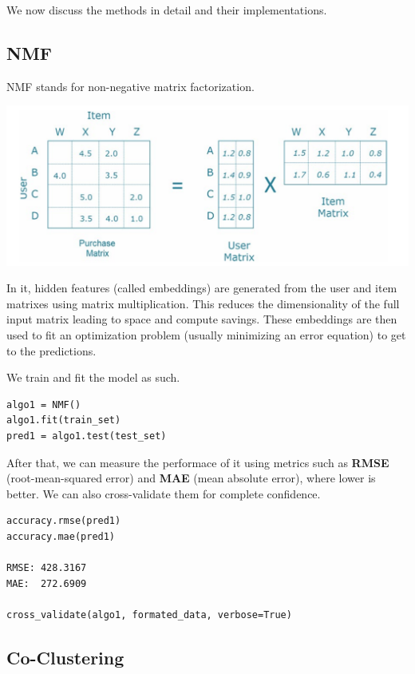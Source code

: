 \documentclass{article}
\begin{document}
We now discuss the methods in detail and their implementations.

\subsection{NMF}

NMF stands for non-negative matrix factorization.

\begin{center}
\includegraphics[scale=0.25]{04.png}
\end{center}

In it, hidden features (called embeddings) are generated from the user and item matrixes using matrix multiplication. This reduces the dimensionality of the full input matrix leading to space and compute savings. These embeddings are then used to fit an optimization problem (usually minimizing an error equation) to get to the predictions.

\medskip

We train and fit the model as such.

\begin{lstlisting}
algo1 = NMF()
algo1.fit(train_set)
pred1 = algo1.test(test_set)
\end{lstlisting}

After that, we can measure the performace of it using metrics such as \textbf{RMSE} (root-mean-squared error) and \textbf{MAE} (mean absolute error), where lower is better. We can also cross-validate them for complete confidence.

\begin{lstlisting}
accuracy.rmse(pred1)
accuracy.mae(pred1)

RMSE: 428.3167
MAE:  272.6909

cross_validate(algo1, formated_data, verbose=True)
\end{lstlisting}

\subsection{Co-Clustering}
\end{document}
